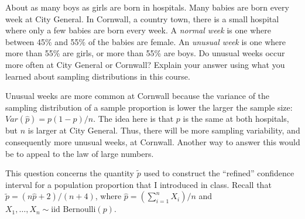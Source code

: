 \documentclass[addpoints,12pt]{exam}
\newcommand{\expect}{\mathbb{E}}
\begin{document}
\begin{questions}


\question[15] About as many boys as girls are born in hospitals. Many babies are born every week at City General. In Cornwall, a country town, there is a small hospital where only a few babies are born every week. A \emph{normal week} is one where between 45\% and 55\% of the babies are female. An \emph{unusual week} is one where more than 55\% are girls, or more than 55\% are boys. Do unusual weeks occur more often at City General or Cornwall? Explain your answer using what you learned about sampling distributions in this course.
	\begin{solution}[2.5in]
		Unusual weeks are more common at Cornwall because the variance of the sampling distribution of a sample proportion is lower the larger the sample size: $Var(\widehat{p}) = p(1-p)/n$. The idea here is that $p$ is the same at both hospitals, but $n$ is larger at City General. Thus, there will be more sampling variability, and consequently more unusual weeks, at Cornwall. Another way to answer this would be to appeal to the law of large numbers.
	\end{solution}
	
	
\question This question concerns the quantity $\tilde{p}$ used to construct the ``refined'' confidence interval for a population proportion that I introduced in class. Recall that $\tilde{p} = (n\widehat{p} +2)/(n+4)$, where $\widehat{p} = \left(\sum_{i=1}^n X_i\right)/n$ and $X_1, \hdots, X_n \sim \mbox{iid Bernoulli}(p)$.
\end{questions}
\end{document}
